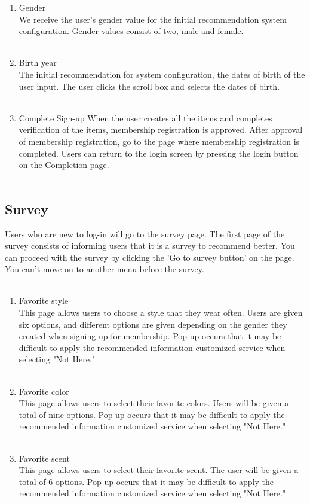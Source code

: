 \documentclass[conference]{IEEEtran}
\begin{document}
\begin{enumerate}
    \item Gender \\
        We receive the user's gender value for the initial recommendation system configuration. Gender values consist of two, male and female. \\ \\
    \item Birth year \\
        The initial recommendation for system configuration, the dates of birth of the user input. The user clicks the scroll box and selects the dates of birth. \\ \\
    \item Complete Sign-up 
        When the user creates all the items and completes verification of the items, membership registration is approved. After approval of membership registration, go to the page where membership registration is completed. Users can return to the login screen by pressing the login button on the Completion page. \\ \\
\end{enumerate}

\subsection{Survey}
Users who are new to log-in will go to the survey page. The first page of the survey consists of informing users that it is a survey to recommend better. You can proceed with the survey by clicking the 'Go to survey button' on the page. You can't move on to another menu before the survey. \\ \\
\begin{enumerate}
    \item Favorite style\\
        This page allows users to choose a style that they wear often. Users are given six options, and different options are given depending on the gender they created when signing up for membership. Pop-up occurs that it may be difficult to apply the recommended information customized service when selecting "Not Here."  \\ \\
    \item Favorite color\\
        This page allows users to select their favorite colors. Users will be given a total of nine options. Pop-up occurs that it may be difficult to apply the recommended information customized service when selecting "Not Here." \\ \\
    \item Favorite scent\\
        This page allows users to select their favorite scent. The user will be given a total of 6 options. Pop-up occurs that it may be difficult to apply the recommended information customized service when selecting "Not Here." \\ \\
\end{enumerate}
\end{document}
